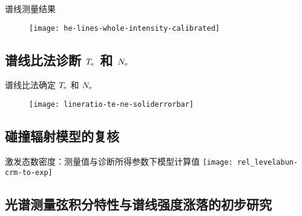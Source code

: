 \begin{CJK*}{UTF8}{kai}
\begin{frame}{谱线测量结果}
	\centering
  \begin{figure}
      \texttt{[image: he-lines-whole-intensity-calibrated]}
  \end{figure}
\end{frame}

\subsection{谱线比法诊断 $T_{\rm e}$ 和 $N_{\rm e}$}

\begin{frame}{谱线比法确定 $T_{\rm e}$ 和 $N_{\rm e}$}
	\vspace{-0.5em}
	\begin{figure}
      \texttt{[image: lineratio-te-ne-soliderrorbar]}
  \end{figure}
\end{frame}

\subsection{碰撞辐射模型的复核}
\begin{frame}{激发态数密度：测量值与诊断所得参数下模型计算值}
	\centering
	\vspace{-0.5em}
    \texttt{[image: rel\_levelabun-crm-to-exp]}
\end{frame}

\subsection{光谱测量弦积分特性与谱线强度涨落的初步研究}



\end{CJK*}
